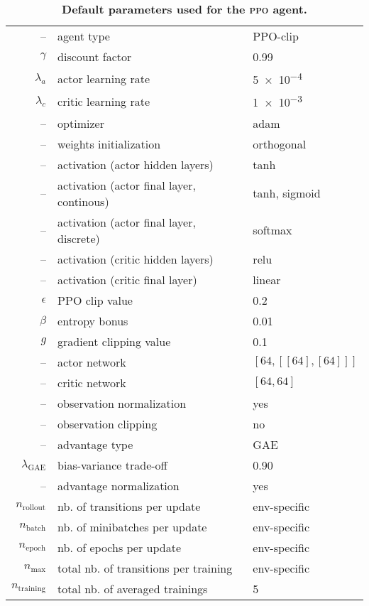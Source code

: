 \begin{table}[h]
    \footnotesize
    \caption{\textbf{Default parameters used for the \textsc{ppo} agent.}}
    \label{table:default_ppo_parameters}
    \centering
    \begin{tabular}{rll}
        \toprule
        --					& agent type						& PPO-clip\\
	$\gamma$ 			& discount factor					& 0.99\\
	$\lambda_a$ 			& actor learning rate					& \num{5e-4}\\
	$\lambda_c$ 			& critic learning rate					& \num{1e-3}\\
	--		 			& optimizer						& adam\\
	--					& weights initialization				& orthogonal\\
	--	 				& activation (actor hidden layers)		& tanh\\
	-- 					& activation (actor final layer, continous)	& tanh, sigmoid\\
	-- 					& activation (actor final layer, discrete)	& softmax\\
	--	 				& activation (critic hidden layers)		& relu\\
	-- 					& activation (critic final layer)			& linear\\
	$\epsilon$ 			& PPO clip value					& 0.2\\
	$\beta$				& entropy bonus					& 0.01\\
	$g$					& gradient clipping value				& 0.1\\	
	-- 					& actor network						& $[64, [[64],[64]]]$\\
	-- 					& critic network						& $[64, 64]$\\
	--					& observation normalization			& yes\\
	--					& observation clipping				& no\\
	--					& advantage type					& GAE\\
	$\lambda_\text{GAE}$	& bias-variance trade-off				& 0.90\\
	--					& advantage normalization			& yes\\\midrule
	$n_\text{rollout}$ 		& nb. of transitions per update			& env-specific\\
	$n_\text{batch}$ 		& nb. of minibatches per update 		& env-specific\\
	$n_\text{epoch}$		& nb. of epochs per update			& env-specific\\
	$n_\text{max}$			& total nb. of transitions per training		& env-specific\\
	$n_\text{training}$		& total nb. of averaged trainings		& 5\\
        \bottomrule
    \end{tabular}
\end{table}
